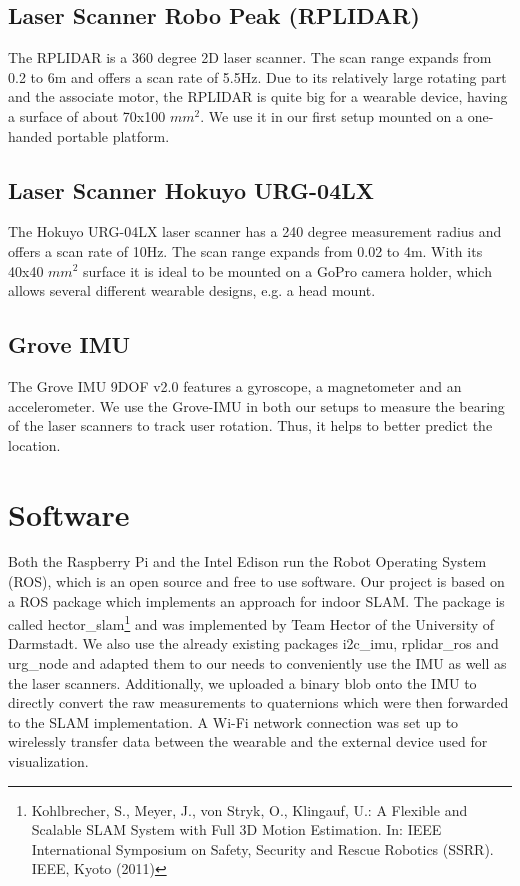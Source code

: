 \documentclass{sigchi-ext}
\begin{document}
\subsection{Laser Scanner Robo Peak (RPLIDAR)}
The RPLIDAR is a 360 degree 2D laser scanner. The scan range expands from 0.2 to 6m and offers a scan rate of 5.5Hz. Due to its relatively large rotating part and the associate motor, the RPLIDAR is quite big for a wearable device, having a surface of about 70x100 $mm^2$. We use it in our first setup mounted on a one-handed portable platform.

\subsection{Laser Scanner Hokuyo URG-04LX}
The Hokuyo URG-04LX laser scanner has a 240 degree measurement radius and offers a scan rate of 10Hz. The scan range expands from 0.02 to 4m. With its 40x40 $mm^2$ surface it is ideal to be mounted on a GoPro camera holder, which allows several different wearable designs, e.g. a head mount.

\subsection{Grove IMU}
The Grove IMU 9DOF v2.0 features a gyroscope, a magnetometer and an accelerometer. We use the Grove-IMU in both our setups to measure the bearing of the laser scanners to track user rotation. Thus, it helps to better predict the location.

\section{Software}
Both the Raspberry Pi and the Intel Edison run the Robot Operating System (ROS), which is an open source and free to use software. Our project is based on a ROS package which implements an approach for indoor SLAM. The package is called hector\_slam\footnote{ Kohlbrecher, S., Meyer, J., von Stryk, O., Klingauf, U.: A Flexible and Scalable
SLAM System with Full 3D Motion Estimation. In: IEEE International Symposium
on Safety, Security and Rescue Robotics (SSRR). IEEE, Kyoto (2011)} and was implemented by Team Hector of the University of Darmstadt. We also use the already existing packages i2c\_imu, rplidar\_ros and urg\_node and adapted them to our needs to conveniently use the IMU as well as the laser scanners. Additionally, we uploaded a binary blob onto the IMU to directly convert the raw measurements to quaternions which were then forwarded to the SLAM implementation. A Wi-Fi network connection was set up to wirelessly transfer data between the wearable and the external device used for visualization.
\end{document}
